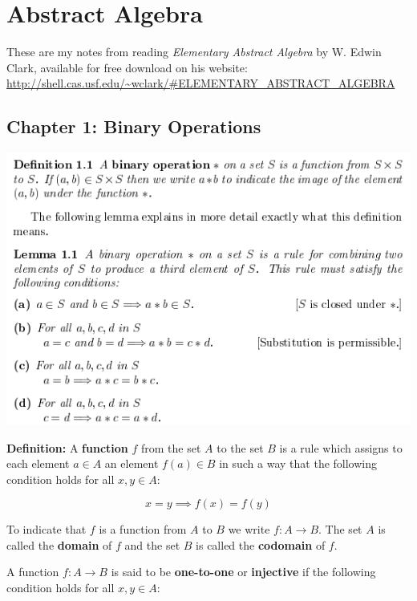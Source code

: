 \documentclass{article}
\begin{document}

\section{Abstract Algebra}

These are my notes from reading \textit{Elementary Abstract Algebra} by W. Edwin Clark, available for free download on his website: \url{http://shell.cas.usf.edu/~wclark/#ELEMENTARY_ABSTRACT_ALGEBRA}

\subsection{Chapter 1: Binary Operations}

\includegraphics[scale=0.65]{binary_operation}


\textbf{Definition:} A \textbf{function} \(f\) from the set \(A\) to the set \(B\) is a rule which assigns to each element \(a \in A\) an element \(f(a) \in B\) in such a way that the following condition holds for all \(x, y \in A\):

\[
x = y \implies f(x) = f(y)
\]

To indicate that \(f\) is a function from \(A\) to \(B\) we write \(f: A \to B\). The set \(A\) is called the \textbf{domain} of \(f\) and the set \(B\) is called the \textbf{codomain} of \(f\).


A function \(f: A \to B\) is said to be \textbf{one-to-one} or \textbf{injective} if the following condition holds for all \(x, y \in A\):
\end{document}

